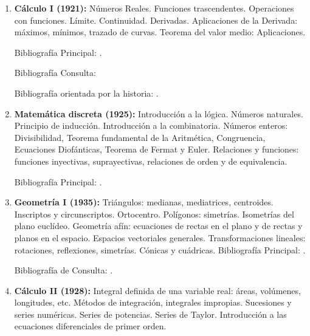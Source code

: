 \documentclass[a4paper, 12pt]{article}
\begin{document}
\begin{enumerate}

\item \textbf{Cálculo I (1921):} Números Reales. Funciones
trascendentes. Operaciones con funciones. Límite. Continuidad.
Derivadas. Aplicaciones de la Derivada: máximos, mínimos, trazado
de curvas. Teorema del valor medio: Aplicaciones.

Bibliografía Principal: \cite{PeterD.Lax631}.

Bibliografía Consulta: \cite{MichaelSpivak649}

Bibliografía orientada por la historia: \cite{ErnstHairer633,DavidApplebaum639,OttoToeplitz642,DavidBressoud643,DavidM.Bressoud651,DavidM.Bressoud688}.


 
\item \textbf{Matemática discreta (1925):} Introducción a la lógica. Números
naturales. Principio de inducción. Introducción a la combinatoria.
Números enteros: Divi\-sibilidad, Teorema fundamental de la
Aritmética, Congruencia,  Ecuaciones Diofánticas, Teorema de
Fermat y Euler. Relaciones y funciones: funciones inyectivas,
suprayectivas, relaciones de orden y de equivalencia.

Bibliografía Principal: \cite{gentile, grimaldi}.




\item \textbf{Geometría I (1935):} Triángulos: medianas, mediatrices, centroides. Inscriptos y
circunscriptos. Ortocentro. Polígonos: simetrías. Isometrías del
plano euclídeo. Geometría afín: ecuaciones de rectas  en
el plano y de rectas y planos en el espacio. Espacios vectoriales generales.
Transformaciones lineales: rotaciones, reflexiones, simetrías.
Cónicas y cuádricas.
Bibliografía Principal: \cite{AllanBerele41,RogerFenn248,RobinHartshorne131,AlfredS.Posamentier49}.

Bibliografía de Consulta: \cite{O.Bottema149,CharlesStanleyOgilvy129,AllanBerele41,GerardA.Venema145,H.S.M.Coxeter226,H.S.M.Coxeter35,MatthewHarvey261,RogerA.Johnson42,coxeter,GJE,villamayor}.




\item \textbf{Cálculo II (1928):}   Integral definida de una variable real: áreas, volúmenes,
longitudes, etc. Métodos de integración, integrales impropias.
Sucesiones y series numéricas. Series de potencias. Series de
Taylor. Introducción a las  ecuaciones diferenciales de primer
orden.



\end{enumerate}
\end{document}
